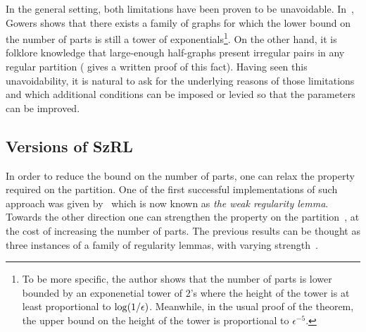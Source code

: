     In the general setting, both limitations have been proven to be unavoidable.
    In~\cite{lower_bounds_of_tower_type_for_szeremedis_uniformity_lemma}, Gowers shows that there exists a family of graphs
    for which the lower bound on the number of parts is still a tower of exponentials\footnote{
    To be more specific, the author shows that the number of parts is lower bounded by an exponenetial tower of $2$'s where
        the height of the tower is at least proportional to $\log( 1/\epsilon )$.
        Meanwhile, in the usual proof of the theorem, the upper bound on the height of the tower is proportional to
        $\epsilon^{-5}$.
    }.
    On the other hand, it is folklore knowledge that large-enough half-graphs present irregular pairs in any
    regular partition (\cite{irregular_pairs_in_half_graphs_szemeredi_regularity} gives a written proof of this fact).
    Having seen this unavoidability, it is natural to ask for the underlying reasons of those limitations and which
    additional conditions can be imposed or levied so that the parameters can be improved.

    \subsection{Versions of SzRL}
    In order to reduce the bound on the number of parts, one can relax the property required on the partition.
    One of the first successful implementations of such approach was given
    by~\cite[Theorem 12]{quick_approximation_to_matrices_and_applications} which is now known as
    \emph{the weak regularity lemma}.
    Towards the other direction one can strengthen the property on the
    partition~\cite[Lemma 4.1]{efficient_testing_of_large_graphs}, at the cost of increasing the number of parts.
    The previous results can be thought as three instances of a family of regularity lemmas, with varying
    strength~\cite{regularity_partitions_and_the_topology_of_graphons, szemeredis_lemma_for_the_analyst}.

